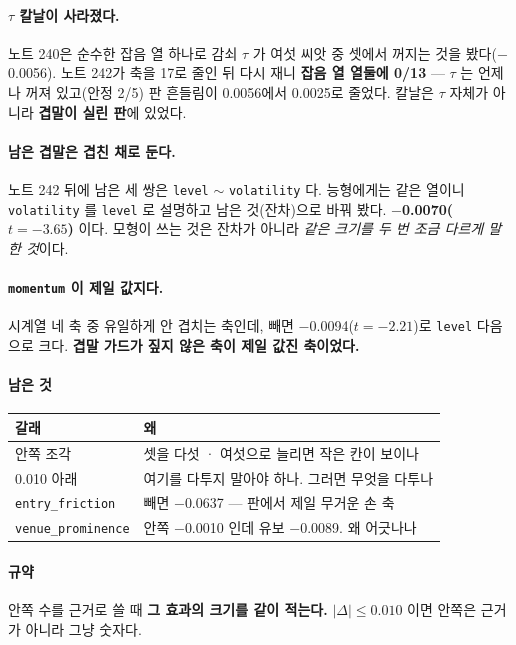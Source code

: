 \documentclass[10pt]{article}
\begin{document}
\paragraph{$\tau$ 칼날이 사라졌다.} 노트 240은 순수한 잡음 열 하나로 감쇠
$\tau$ 가 여섯 씨앗 중 셋에서 꺼지는 것을 봤다($-$0.0056). 노트 242가 축을
17로 줄인 뒤 다시 재니 \textbf{잡음 열 열둘에 0/13} --- $\tau$ 는 언제나
꺼져 있고(안정 2/5) 판 흔들림이 0.0056에서 0.0025로 줄었다. 칼날은
$\tau$ 자체가 아니라 \textbf{겹말이 실린 판}에 있었다.

\paragraph{남은 겹말은 겹친 채로 둔다.} 노트 242 뒤에 남은 세 쌍은
\texttt{level} $\sim$ \texttt{volatility} 다. 능형에게는 같은 열이니
\texttt{volatility} 를 \texttt{level} 로 설명하고 남은 것(잔차)으로 바꿔
봤다. \textbf{$-$0.0070($t{=}-3.65$)} 이다. 모형이 쓰는 것은 잔차가 아니라
\emph{같은 크기를 두 번 조금 다르게 말한 것}이다.

\paragraph{\texttt{momentum} 이 제일 값지다.} 시계열 네 축 중 유일하게 안
겹치는 축인데, 빼면 $-$0.0094($t{=}-2.21$)로 \texttt{level} 다음으로 크다.
\textbf{겹말 가드가 짚지 않은 축이 제일 값진 축이었다.}

\paragraph{남은 것}
\begin{center}\small
\begin{tabular}{ll}
\hline
갈래 & 왜 \\
\hline
안쪽 조각 & 셋을 다섯 · 여섯으로 늘리면 작은 칸이 보이나 \\
0.010 아래 & 여기를 다투지 말아야 하나. 그러면 무엇을 다투나 \\
\texttt{entry\_friction} & 빼면 $-$0.0637 --- 판에서 제일 무거운 손 축 \\
\texttt{venue\_prominence} & 안쪽 $-$0.0010 인데 유보 $-$0.0089. 왜 어긋나나 \\
\hline
\end{tabular}
\end{center}

\paragraph{규약} 안쪽 수를 근거로 쓸 때 \textbf{그 효과의 크기를 같이 적는다.}
$|\Delta| \le 0.010$ 이면 안쪽은 근거가 아니라 그냥 숫자다.
\end{document}
